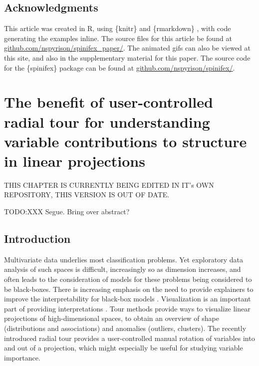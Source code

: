 \documentclass{template/monashthesis}
\begin{document}
\hypertarget{acknowledgments}{%
\section{Acknowledgments}\label{acknowledgments}}

This article was created in R, using \{knitr\} \autocite{xie_knitr_2020} and \{rmarkdown\} \autocite{allaire_rmarkdown_2020}, with code generating the examples inline. The source files for this article be found at \href{https://github.com/nspyrison/spinifex_paper/}{github.com/nspyrison/spinifex\_paper/}. The animated gifs can also be viewed at this site, and also in the supplementary material for this paper. The source code for the \{spinifex\} package can be found at \href{https://github.com/nspyrison/spinifex/}{github.com/nspyrison/spinifex/}.

\hypertarget{ch:efficacy_radial_tour}{%
\chapter{The benefit of user-controlled radial tour for understanding variable contributions to structure in linear projections}\label{ch:efficacy_radial_tour}}

THIS CHAPTER IS CURRENTLY BEING EDITED IN IT's OWN REPOSITORY, THIS VERSION IS OUT OF DATE.

TODO:XXX Segue. Bring over abstract?

\hypertarget{introduction-1}{%
\section{Introduction}\label{introduction-1}}

Multivariate data underlies most classification problems. Yet exploratory data analysis \autocite[EDA,][]{tukey_exploratory_1977} of such spaces is difficult, increasingly so as dimension increases, and often leads to the consideration of models for these problems being considered to be black-boxes. There is increasing emphasis on the need to provide explainers to improve the interpretability for black-box models \autocite{biecek_dalex_2018,biecek_explanatory_2021,lundberg_unified_2017,ribeiro_why_2016,wickham_visualizing_2015}. Visualization is an important part of providing interpretations \autocite{anscombe_graphs_1973,coleman_geometric_1986,goodman_dirty_2008,matejka_same_2017}. Tour methods \autocite{lee_review_2021,cook_grand_2008} provide ways to visualize linear projections of high-dimensional spaces, to obtain an overview of shape (distributions and associations) and anomalies (outliers, clusters). The recently introduced radial tour \autocite{spyrison_spinifex_2020} provides a user-controlled manual rotation of variables into and out of a projection, which might especially be useful for studying variable importance.
\end{document}
